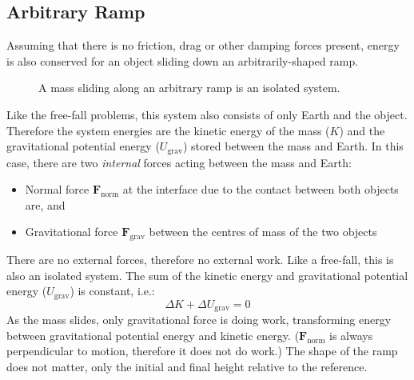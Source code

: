 \subsection{Arbitrary Ramp}

Assuming that there is no friction, drag or other damping forces present,
energy is also conserved for an object sliding down an arbitrarily-shaped ramp.
\begin{figure}[ht]
  \centering
  \caption{A mass sliding along an arbitrary ramp is an isolated system.}
  \label{fig:ramp-system}
\end{figure}
Like the free-fall problems, this system also consists of only Earth and the
object. Therefore the system energies are the kinetic energy of the mass ($K$)
and the gravitational potential energy ($U_\text{grav}$) stored between the mass
and Earth. In this case, there are two \emph{internal} forces acting between
the mass and Earth:
\begin{itemize}[itemsep=6pt]
\item Normal force $\bm F_\text{norm}$ at the interface due to the contact
  between both objects are, and 
\item Gravitational force $\bm F_\text{grav}$ between the centres of mass of the
  two objects
\end{itemize}
There are no external forces, therefore no external work. Like a free-fall,
this is also an isolated system. The sum of the kinetic energy
and gravitational potential energy ($U_\text{grav}$) is constant, i.e.:
\begin{equation}
  \Delta K+\Delta U_\text{grav}=0
\end{equation}
As the mass slides, only gravitational force is doing work, transforming energy
between gravitational potential energy and kinetic energy. ($\bm F_\text{norm}$
is always perpendicular to motion, therefore it does not do work.) The shape of
the ramp does not matter, only the initial and final height relative to the
reference.


